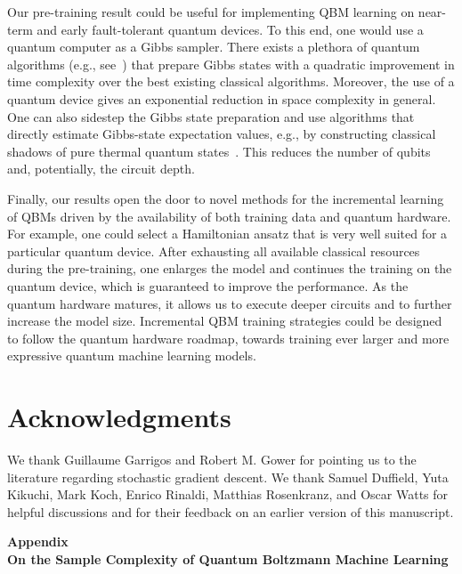\documentclass[
    aps,
    prx,
    floatfix,
    nofootinbib,
    onecolumn
]{revtex4-2}
\begin{document}
Our pre-training result could be useful for implementing QBM learning on near-term and early fault-tolerant quantum devices. To this end, one would use a quantum computer as a Gibbs sampler. There exists a plethora of quantum algorithms (e.g., see~\cite{Temme_2011, Chowdhury_2016, Holmes_2022, chifang2023quantum, zhang2023dissipative}) that prepare Gibbs states with a quadratic improvement in time complexity over the best existing classical algorithms. Moreover, the use of a quantum device gives an exponential reduction in space complexity in general. One can also sidestep the Gibbs state preparation and use algorithms that directly estimate Gibbs-state expectation values, e.g., by constructing classical shadows of pure thermal quantum states~\cite{Coopmans_2023}. This reduces the number of qubits and, potentially, the circuit depth.

Finally, our results open the door to novel methods for the incremental learning of QBMs driven by the availability of both training data and quantum hardware. For example, one could select a Hamiltonian ansatz that is very well suited for a particular quantum device. After exhausting all available classical resources during the pre-training, one enlarges the model and continues the training on the quantum device, which is guaranteed to improve the performance. As the quantum hardware matures, it allows us to execute deeper circuits and to further increase the model size. Incremental QBM training strategies could be designed to follow the quantum hardware roadmap, towards training ever larger and more expressive quantum machine learning models.

\section*{Acknowledgments}
We thank Guillaume Garrigos and Robert M. Gower for pointing us to the literature regarding stochastic gradient descent. We thank Samuel Duffield, Yuta Kikuchi, Mark Koch, Enrico Rinaldi, Matthias Rosenkranz, and Oscar Watts for helpful discussions and for their feedback on an earlier version of this manuscript.

\let\oldaddcontentsline\addcontentsline
\renewcommand{\addcontentsline}[3]{}

\let\addcontentsline\oldaddcontentsline

\clearpage
\appendix
\onecolumngrid
\begin{center}
	\noindent\textbf{Appendix}\\
	\bigskip
	\noindent\textbf{\large{On the Sample Complexity of Quantum Boltzmann Machine Learning}}
\end{center}
\tableofcontents
\end{document}

